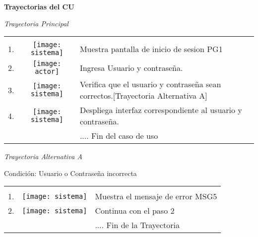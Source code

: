 \documentclass[10pt,spanish]{article}
\providecommand{\tabularnewline}{\\}
\begin{document}


\textbf{\large Trayectorias del CU}{\large \par}

\textit{\large Trayectoria Principal}{\large {} }{\large \par}


\begin{tabular}{ccl}
 &  & \tabularnewline
1.  & \texttt{[image: sistema]}  & \multicolumn{1}{p{12cm}}{Muestra pantalla de inicio de sesion PG1}\tabularnewline
2.  & \texttt{[image: actor]}  & \multicolumn{1}{p{12cm}}{Ingresa Usuario y contraseña.}\tabularnewline
3.  & \texttt{[image: sistema]}  & \multicolumn{1}{p{12cm}}{Verifica que el usuario y contraseña sean correctos.{[}Trayectoria Alternativa A{]}}\tabularnewline
4.  & \texttt{[image: sistema]}  & \multicolumn{1}{p{12cm}}{Despliega interfaz correspondiente al usuario y contraseña.}\tabularnewline
 &  & \multicolumn{1}{p{12cm}}{.... Fin del caso de uso}\tabularnewline
\end{tabular}

\textit{Trayectoria Alternativa A}

Condición: Usuario o Contraseña incorrecta

\begin{tabular}{ccl}
 &  & \tabularnewline
1.  & \texttt{[image: sistema]}  & \multicolumn{1}{p{12cm}}{ Muestra el mensaje de error MSG5}\tabularnewline
2.  & \texttt{[image: sistema]}  & \multicolumn{1}{p{12cm}}{Continua con el paso 2}\tabularnewline
 &  & \multicolumn{1}{p{12cm}}{.... Fin de la Trayectoria}\tabularnewline
\end{tabular}

\end{document}
